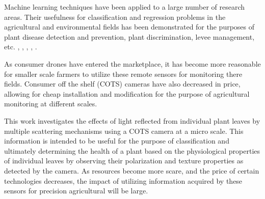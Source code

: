 Machine learning techniques have been applied to a large number of research areas.  Their usefulness for classification and regression problems in the agricultural and environmental fields has been demonstrated for the purposes of plant disease detection and prevention, plant discrimination, levee management, etc. \cite{mississippi}, \cite{plantdiscrimination}, \cite{plantvirus}, \cite{recognitionplants}, \cite{laserplants}.

As consumer drones have entered the marketplace, it has become more reasonable for smaller scale farmers to utilize these remote sensors for monitoring there fields.  Consumer off the shelf (COTS) cameras have also decreased in price, allowing for cheap installation and modification for the purpose of agricultural monitoring at different scales.

This work investigates the effects of light reflected from individual plant leaves by multiple scattering mechanisms using a COTS camera at a micro scale.  This information is intended to be useful for the purpose of classification and ultimately determining the health of a plant based on the physiological properties of individual leaves by observing their polarization and texture properties as detected by the camera.  As resources become more scare, and the price of certain technologies decreases, the impact of utilizing information acquired by these sensors for precision agricultural will be large.
